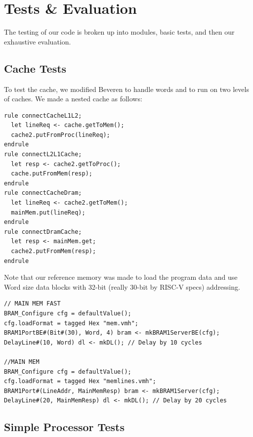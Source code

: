 \documentclass{article}
\begin{document}


\section{Tests \& Evaluation}

The testing of our code is broken up into modules, basic tests, and then our exhaustive evaluation.

\subsection{Cache Tests}
To test the cache, we modified Beveren to handle words and to run on two levels of caches. We made a nested cache as follows:
\begin{lstlisting}
rule connectCacheL1L2;
  let lineReq <- cache.getToMem();
  cache2.putFromProc(lineReq);
endrule
rule connectL2L1Cache;
  let resp <- cache2.getToProc();
  cache.putFromMem(resp);
endrule
rule connectCacheDram;
  let lineReq <- cache2.getToMem();
  mainMem.put(lineReq);
endrule
rule connectDramCache;
  let resp <- mainMem.get;
  cache2.putFromMem(resp);
endrule
\end{lstlisting}
Note that our reference memory was made to load the program data and use Word size data blocks with 32-bit (really 30-bit by RISC-V specs) addressing.
\begin{lstlisting}
// MAIN MEM FAST
BRAM_Configure cfg = defaultValue();
cfg.loadFormat = tagged Hex "mem.vmh";
BRAM1PortBE#(Bit#(30), Word, 4) bram <- mkBRAM1ServerBE(cfg);
DelayLine#(10, Word) dl <- mkDL(); // Delay by 10 cycles

//MAIN MEM
BRAM_Configure cfg = defaultValue();
cfg.loadFormat = tagged Hex "memlines.vmh";
BRAM1Port#(LineAddr, MainMemResp) bram <- mkBRAM1Server(cfg);
DelayLine#(20, MainMemResp) dl <- mkDL(); // Delay by 20 cycles
\end{lstlisting}

\subsection{Simple Processor Tests}
\end{document}

